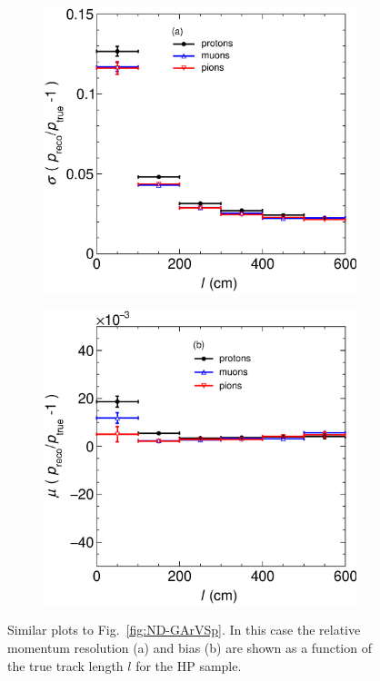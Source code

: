 \begin{figure}[!ht]
     \centering
     \begin{subfigure}[b]{0.49\textwidth}
         \centering
         \includegraphics[width=\textwidth]{figures/ch5-KF_NDGAr/ToySample/HighPres/RespVSLength_XL.eps}
         \caption{}
         \label{fig:ResND-GArVSlength}
     \end{subfigure}
     \begin{subfigure}[b]{0.49\textwidth}
         \centering
         \includegraphics[width=\textwidth]{figures/ch5-KF_NDGAr/ToySample/HighPres/BiaspVSLength_XL.eps}
         \caption{}
         \label{fig:BiasND-GArVSlength}
     \end{subfigure}
        \caption{Similar plots to Fig.~\ref{fig:ND-GArVSp}. In this case the relative momentum resolution (a) and bias (b) are shown as a function of the true track length $l$ for the HP sample.}
        \label{fig:ND-GArVSlength}
\end{figure}

